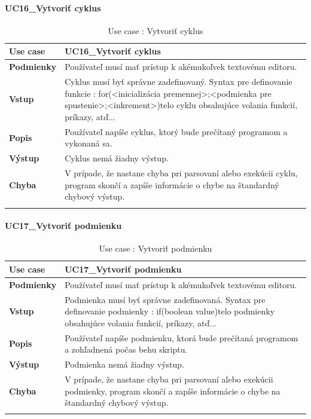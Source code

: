 \paragraph{UC16\_Vytvoriť cyklus}
\begin{center}
	\begin{longtable}{|p{2.5cm}|p{12.2cm}|}
		
			\hline
			\textbf{Use case} & UC16\_Vytvoriť cyklus \\ 
			\hline
			\textbf{Podmienky} & Používateľ musí mať prístup k akémukoľvek textovému editoru.  \\ 
			\hline
			\textbf{Vstup} & Cyklus musí byť správne zadefinovaný. 
			Syntax pre definovanie funkcie : 
			\newline
			for(<inicializácia premennej>;<podmienka pre spustenie>;<inkrement>){telo cyklu obsahujúce volania funkcií, príkazy, atď..}. \\
			\hline

			\textbf{Popis} & Používateľ napíše cyklus, ktorý bude prečítaný programom a vykonaná sa.\\ 
			\hline
			\textbf{Výstup} & Cyklus nemá žiadny výstup.\\
			\hline
			\textbf{Chyba} & V prípade, že nastane chyba pri parsovaní alebo exekúcii cyklu, program skončí a zapíše informácie o chybe na štandardný chybový výstup.\\
			\hline
		\caption{Use case : Vytvoriť cyklus}
		\label{table:1}
		
	\end{longtable}
\end{center}
\paragraph{UC17\_Vytvoriť podmienku}
\begin{center}
	\begin{longtable}{|p{2.5cm}|p{12.2cm}|}
		
			\hline
			\textbf{Use case} & UC17\_Vytvoriť podmienku \\ 
			\hline
			\textbf{Podmienky} & Používateľ musí mať prístup k akémukoľvek textovému editoru.  \\ 
			\hline
			\textbf{Vstup} & Podmienka musí byť správne zadefinovaná. 
			Syntax pre definovanie podmienky : 
			\newline
			if(boolean value){telo podmienky obsahujúce volania funkcií, príkazy, atď..}. \\
			\hline
			\textbf{Popis} & Používateľ napíše podmienku, ktorá bude prečítaná programom a zohľadnená počas behu skriptu.\\ 
			\hline
			\textbf{Výstup} & Podmienka nemá žiadny výstup.\\
			\hline
			\textbf{Chyba} & V prípade, že nastane chyba pri parsovaní alebo exekúcii podmienky, program skončí a zapíše informácie o chybe na štandardný chybový výstup.\\
			\hline
		\caption{Use case : Vytvoriť podmienku}
		\label{table:1}
		
	\end{longtable}
\end{center}
